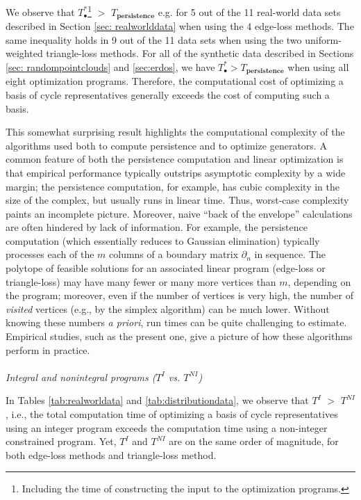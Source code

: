 \documentclass[11pt,onecolumn]{article}
\newcommand{\se}{Section }
\theoremstyle{plain}
\theoremstyle{definition}
\begin{document}
We observe that $T_\bullet^*$\footnote{Including the time of constructing the input to the optimization programs.} $>$ $T_\textbf{persistence}$  e.g. for 5 out of the 11 real-world data sets described in \se \ref{sec: realworlddata} when using the 4 edge-loss methods.  The same inequality holds in 9 out of the 11 data sets when using the two uniform-weighted triangle-loss methods. For all of the synthetic data described in Sections \ref{sec: randompointclouds} and \ref{sec:erdos}, we have $T_\bullet^* > T_\textbf{persistence}$  when using all eight optimization programs. Therefore, the computational cost of optimizing a basis of cycle representatives generally exceeds the cost of computing such a basis.

This somewhat surprising result highlights the computational complexity of the algorithms used both to compute persistence and to optimize generators.  A common feature of both the persistence computation and linear optimization is that empirical performance  typically outstrips asymptotic complexity by a wide margin; the persistence computation, for example, has cubic complexity in the size of the complex, but usually runs in linear time.  Thus, worst-case complexity paints an incomplete picture.   Moreover, naive ``back of the envelope'' calculations are often hindered by lack of information.  For example, the persistence computation (which essentially reduces to Gaussian elimination) typically processes each of the $m$ columns of a boundary matrix $\partial_n$ in sequence. The polytope of feasible solutions for an associated linear program (edge-loss or triangle-loss) may have many fewer or many more vertices than $m$, depending on the program; moreover, even if the number of vertices is very high, the number of \emph{visited} vertices (e.g., by the simplex algorithm) can be much lower.  Without knowing these numbers \emph{a priori}, run times can be quite challenging to estimate. Empirical studies, such as the present one, give a picture of how these algorithms perform in practice.
\\
\\
\noindent \emph{Integral and nonintegral programs ($T^I$ vs. $T^{NI}$)}

In Tables \ref{tab:realworldata} and \ref{tab:distributiondata}, we observe that $T^I$ $>$ $T^{NI}$, i.e., the total computation time of optimizing a basis of cycle representatives using an integer program exceeds the computation time using a non-integer constrained program. Yet, $T^I$ and $T^{NI}$ are on the same order of magnitude, for both edge-loss methods and triangle-loss method.  
\end{document}
